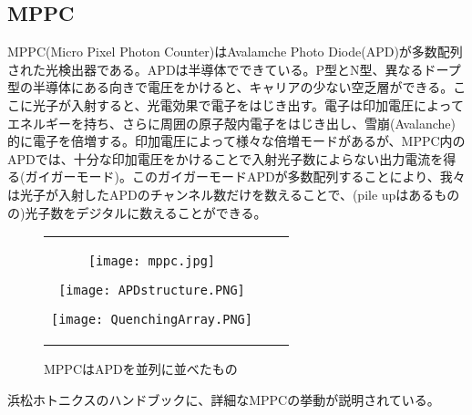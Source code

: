 \documentclass[10pt,a4j]{jarticle}
\begin{document}
\subsection{MPPC}
MPPC(Micro Pixel Photon Counter)はAvalamche Photo Diode(APD)が多数配列された光検出器である。APDは半導体でできている。P型とN型、異なるドープ型の半導体にある向きで電圧をかけると、キャリアの少ない空乏層ができる。ここに光子が入射すると、光電効果で電子をはじき出す。電子は印加電圧によってエネルギーを持ち、さらに周囲の原子殻内電子をはじき出し、雪崩(Avalanche)的に電子を倍増する。印加電圧によって様々な倍増モードがあるが、MPPC内のAPDでは、十分な印加電圧をかけることで入射光子数によらない出力電流を得る(ガイガーモード)。このガイガーモードAPDが多数配列することにより、我々は光子が入射したAPDのチャンネル数だけを数えることで、(pile upはあるものの)光子数をデジタルに数えることができる。
\begin{figure}[h]
\begin{tabular}{ccc}
\begin{minipage}[t]{0.33\hsize}
\begin{center}
\texttt{[image: mppc.jpg]}
\end{center}
\caption{MPPC}
\end{minipage}
\begin{minipage}[t]{0.33\hsize}
\begin{center}
\texttt{[image: APDstructure.PNG]}
\end{center}
\caption{APD}
\end{minipage}
\begin{minipage}[t]{0.33\hsize}
\begin{center}
\texttt{[image: QuenchingArray.PNG]}
\end{center}
\caption{MPPCはAPDを並列に並べたもの}
\end{minipage}
\end{tabular}
\end{figure}
浜松ホトニクスのハンドブックに、詳細なMPPCの挙動が説明されている。\cite{hamamatsu}
\end{document}

